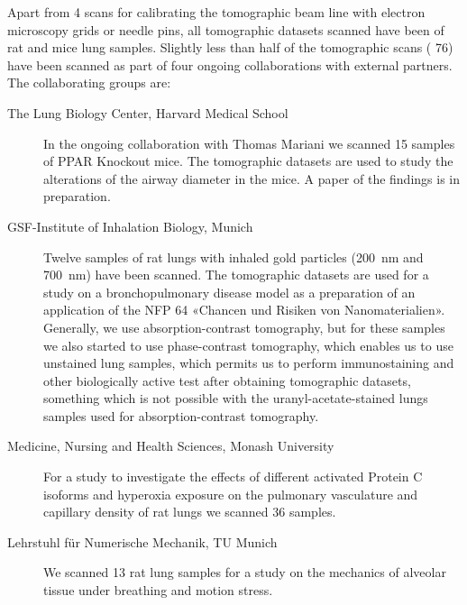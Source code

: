 \documentclass[a4paper,twoside,DIV=calc]{scrartcl}
\begin{document}
Apart from 4 scans for calibrating the tomographic beam line with electron microscopy grids or needle pins, all tomographic datasets scanned have been of rat and mice lung samples. Slightly less than half of the tomographic scans (%
76) have been scanned as part of four ongoing collaborations with external partners. The collaborating groups are:
\begin{description}
\item[The Lung Biology Center, Harvard Medical School] In the ongoing collaboration with Thomas Mariani we scanned 15 samples of PPAR Knockout mice. The tomographic datasets are used to study the alterations of the airway diameter in the mice. A paper of the findings is in preparation.
\item[GSF-Institute of Inhalation Biology, Munich] Twelve samples of rat lungs with inhaled gold particles (\SI{200}{\nano\meter} and \SI{700}{\nano\meter}) have been scanned. The tomographic datasets are used for a study on a bronchopulmonary disease model as a preparation of an application of the NFP 64 «Chancen und Risiken von Nanomaterialien». Generally, we use absorption-contrast tomography, but for these samples we also started to use phase-contrast tomography, which enables us to use unstained lung samples, which permits us to perform immunostaining and other biologically active test after obtaining tomographic datasets, something which is not possible with the uranyl-acetate-stained lungs samples used for absorption-contrast tomography.
\item[Medicine, Nursing and Health Sciences, Monash University] For a study to investigate the effects of different activated Protein C isoforms and hyperoxia exposure on the pulmonary vasculature and capillary density of rat lungs we scanned 36 samples. 
\item[Lehrstuhl für Numerische Mechanik, TU Munich] We scanned 13 rat lung samples for a study on the mechanics of alveolar tissue under breathing and motion stress.
\end{description}

\end{document}
